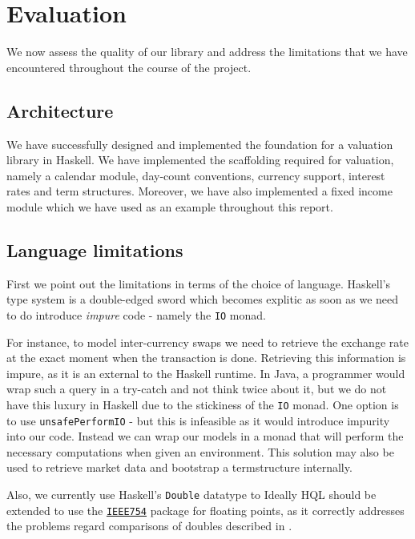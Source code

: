 \chapter{Evaluation}

We now assess the quality of our library and address the limitations that we
have encountered throughout the course of the project.

\section{Architecture}

We have successfully designed and implemented the foundation for a valuation 
library in Haskell. We have implemented the scaffolding required for valuation, 
namely a calendar module, day-count conventions, currency support, interest 
rates and term structures. Moreover, we have also implemented a fixed income 
module which we have used as an example throughout this report.

\section{Language limitations}

First we point out the limitations in terms of the choice of language.
Haskell's type system is a double-edged sword which becomes explitic as soon 
as we need to do introduce \emph{impure} code - namely the \texttt{IO} monad.

For instance, to model inter-currency swaps we need to retrieve the exchange 
rate at the exact moment when the transaction is done. Retrieving this 
information is impure, as it is an external to the Haskell runtime. In Java, a 
programmer would wrap such a query in a try-catch and not think twice about it, 
but we do not have this luxury in Haskell due to the stickiness of the 
\texttt{IO} monad. One option is to use \texttt{unsafePerformIO} - but this is 
infeasible as it would introduce impurity into our code.
Instead we can wrap our models in a monad that will perform the necessary 
computations when given an environment. This solution may also be used to 
retrieve market data and bootstrap a termstructure internally.

Also, we currently use Haskell's \texttt{Double} datatype to 
Ideally HQL should be extended to use the \href{https://hackage.haskell.org/package/data-binary-ieee754}{\texttt{IEEE754}} package for floating 
points, as it correctly addresses the problems regard comparisons of 
doubles described in \cite{blogpost}.

